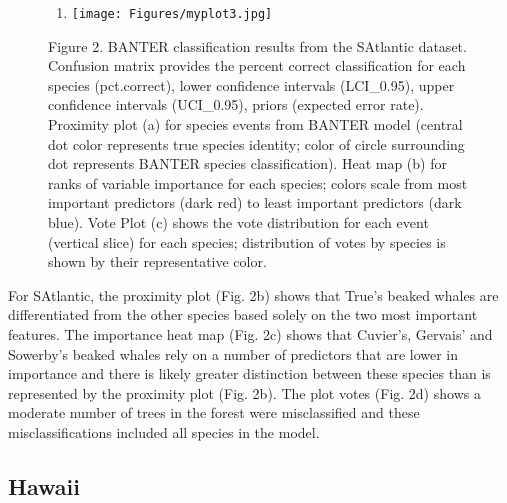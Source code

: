 \documentclass[
  authoryear,
  preprint,
  3p]{elsarticle}
\providecommand{\tightlist}{%
  \setlength{\itemsep}{0pt}\setlength{\parskip}{0pt}}\usepackage{longtable,booktabs,array}
\begin{document}
\begin{figure}
\begin{minipage}[b]{0.33\linewidth}
{}

\end{minipage}%
%
\begin{minipage}[b]{0.33\linewidth}

{\centering 

\begin{enumerate}
\def\labelenumi{\alph{enumi})}
\setcounter{enumi}{2}
\tightlist
\item
  \texttt{[image: Figures/myplot3.jpg]}
\end{enumerate}

}

\end{minipage}%
\newline
\begin{minipage}[b]{0.33\linewidth}

{\centering 

Figure 2. BANTER classification results from the SAtlantic dataset.
Confusion matrix provides the percent correct classification for each
species (pct.correct), lower confidence intervals (LCI\_0.95), upper
confidence intervals (UCI\_0.95), priors (expected error rate).
Proximity plot (a) for species events from BANTER model (central dot
color represents true species identity; color of circle surrounding dot
represents BANTER species classification). Heat map (b) for ranks of
variable importance for each species; colors scale from most important
predictors (dark red) to least important predictors (dark blue). Vote
Plot (c) shows the vote distribution for each event (vertical slice) for
each species; distribution of votes by species is shown by their
representative color.

}

\end{minipage}%

\end{figure}

For SAtlantic, the proximity plot (Fig. 2b) shows that True's beaked
whales are differentiated from the other species based solely on the two
most important features. The importance heat map (Fig. 2c) shows that
Cuvier's, Gervais' and Sowerby's beaked whales rely on a number of
predictors that are lower in importance and there is likely greater
distinction between these species than is represented by the proximity
plot (Fig. 2b). The plot votes (Fig. 2d) shows a moderate number of
trees in the forest were misclassified and these misclassifications
included all species in the model.

\hypertarget{hawaii}{%
\subsection{Hawaii}\label{hawaii}}
\end{document}
